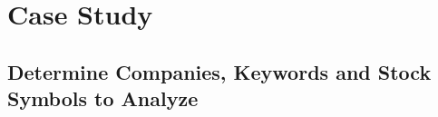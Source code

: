 
\chapter{Case Study}
\label{c:casestudy}




\lipsum[1]

\section{Determine Companies, Keywords and Stock Symbols to Analyze}
\label{s:casestudy-companieskeywords}


